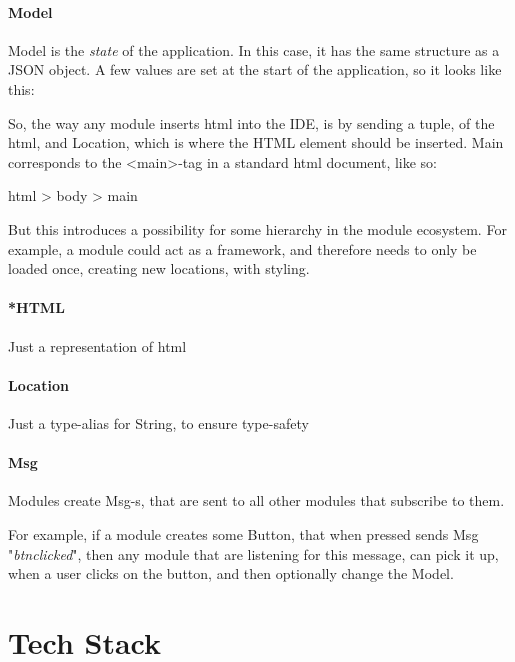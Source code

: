 \paragraph{Model}
Model is the \textit{state} of the application. In this case, it has the same
structure as a JSON object. A few values are set at the start of the
application, so it looks like this:


So, the way any module inserts \gls{html} into the IDE, is by sending a tuple,
of the \gls{html}, and Location, which is where the HTML element should be
inserted. Main corresponds to the <main>-tag in a standard \gls{html} document,
like so:

html > body > main

But this introduces a possibility for some hierarchy in the module ecosystem.
For example, a module could act as a framework, and therefore needs to only be
loaded once, creating new locations, with styling.


\paragraph{*HTML}
Just a representation of \gls{html}


\paragraph{Location}
Just a type-alias for String, to ensure type-safety


\paragraph{Msg}
Modules create Msg-s, that are sent to all other modules that subscribe to them.

For example, if a module creates some Button, that when pressed sends
Msg "\textit{btn\-clicked}", then any module that are listening for this message,
can pick it up, when a user clicks on the button, and then optionally change the
Model.

\section{Tech Stack}

